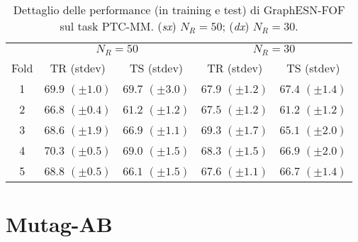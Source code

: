 
\begin{table}[tbph]
\footnotesize
\caption[Dettaglio performance: GraphESN-FOF su PTC-MM]{Dettaglio delle performance (in training e test) di GraphESN-FOF sul task PTC-MM. (\emph{sx}) $N_R=50$; (\emph{dx}) $N_R=30$.}
\label{app:esp:PTC-MM-FOF}
\centering
\begin{tabular}{c*{4}{c}}
\toprule
& \multicolumn{2}{c}{$N_R=50$} & \multicolumn{2}{c}{$N_R=30$}\\
Fold & TR (stdev) & TS (stdev) & TR (stdev) & TS (stdev)\\
\midrule
1 & $69.9$ $(\pm 1.0)$ & $69.7$ $(\pm 3.0)$ & $67.9$ $(\pm 1.2)$ & $67.4$ $(\pm 1.4)$\\
2 & $66.8$ $(\pm 0.4)$ & $61.2$ $(\pm 1.2)$ & $67.5$ $(\pm 1.2)$ & $61.2$ $(\pm 1.2)$\\
3 & $68.6$ $(\pm 1.9)$ & $66.9$ $(\pm 1.1)$ & $69.3$ $(\pm 1.7)$ & $65.1$ $(\pm 2.0)$\\
4 & $70.3$ $(\pm 0.5)$ & $69.0$ $(\pm 1.5)$ & $68.3$ $(\pm 1.5)$ & $66.9$ $(\pm 2.0)$\\
5 & $68.8$ $(\pm 0.5)$ & $66.1$ $(\pm 1.5)$ & $67.6$ $(\pm 1.1)$ & $66.7$ $(\pm 1.4)$\\
\bottomrule
\end{tabular}
\end{table}





\clearpage
\section{Mutag-AB}


